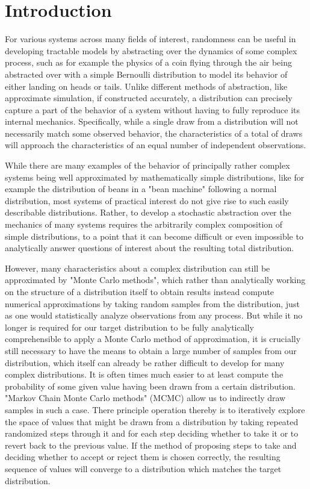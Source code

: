 \section{Introduction}

For various systems across many fields of interest, randomness can be useful in developing tractable models by abstracting over the dynamics of some complex process, such as for example the physics of a coin flying through the air being abstracted over with a simple Bernoulli distribution to model its behavior of either landing on heads or tails. Unlike different methods of abstraction, like approximate simulation, if constructed accurately, a distribution can precisely capture a part of the behavior of a system without having to fully reproduce its internal mechanics. Specifically, while a single draw from a distribution will not necessarily match some observed behavior, the characteristics of a total of draws will approach the characteristics of an equal number of independent observations.

While there are many examples of the behavior of principally rather complex systems being well approximated by mathematically simple distributions, like for example the distribution of beans in a "bean machine" following a normal distribution, most systems of practical interest do not give rise to such easily describable distributions. Rather, to develop a stochastic abstraction over the mechanics of many systems requires the arbitrarily complex composition of simple distributions, to a point that it can become difficult or even impossible to analytically answer questions of interest about the resulting total distribution.

However, many characteristics about a complex distribution can still be approximated by "Monte Carlo methods", which rather than analytically working on the structure of a distribution itself to obtain results instead compute numerical approximations by taking random samples from the distribution, just as one would statistically analyze observations from any process. But while it no longer is required for our target distribution to be fully analytically comprehensible to apply a Monte Carlo method of approximation, it is crucially still necessary to have the means to obtain a large number of samples from our distribution, which itself can already be rather difficult to develop for many complex distributions. It is often times much easier to at least compute the probability of some given value having been drawn from a certain distribution. "Markov Chain Monte Carlo methods" (MCMC) allow us to indirectly draw samples in such a case. There principle operation thereby is to iteratively explore the space of values that might be drawn from a distribution by taking repeated randomized steps through it and for each step deciding whether to take it or to revert back to the previous value. If the method of proposing steps to take and deciding whether to accept or reject them is chosen correctly, the resulting sequence of values will converge to a distribution which matches the target distribution.

